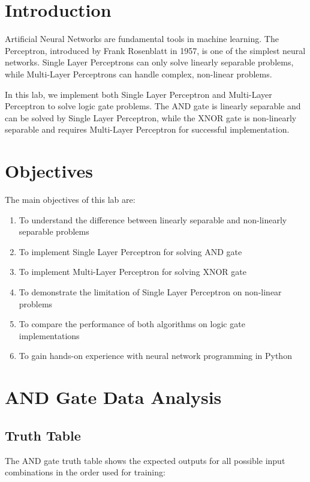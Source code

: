 \documentclass[12pt]{article}
\begin{document}
\section*{Introduction}
Artificial Neural Networks are fundamental tools in machine learning. The Perceptron, introduced by Frank Rosenblatt in 1957, is one of the simplest neural networks. Single Layer Perceptrons can only solve linearly separable problems, while Multi-Layer Perceptrons can handle complex, non-linear problems.

In this lab, we implement both Single Layer Perceptron and Multi-Layer Perceptron to solve logic gate problems. The AND gate is linearly separable and can be solved by Single Layer Perceptron, while the XNOR gate is non-linearly separable and requires Multi-Layer Perceptron for successful implementation.

\section*{Objectives}
The main objectives of this lab are:

\begin{enumerate}
    \item To understand the difference between linearly separable and non-linearly separable problems
    \item To implement Single Layer Perceptron for solving AND gate
    \item To implement Multi-Layer Perceptron for solving XNOR gate
    \item To demonstrate the limitation of Single Layer Perceptron on non-linear problems
    \item To compare the performance of both algorithms on logic gate implementations
    \item To gain hands-on experience with neural network programming in Python
\end{enumerate}

\section*{AND Gate Data Analysis}

\subsection*{Truth Table}
The AND gate truth table shows the expected outputs for all possible input combinations in the order used for training:
\end{document}

